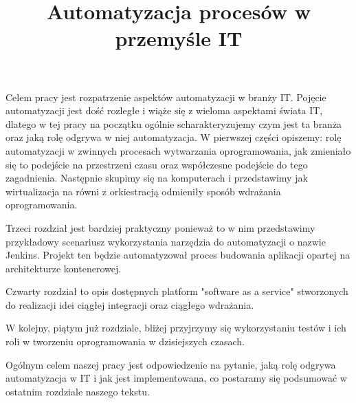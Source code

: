 \documentclass[twoside]{projektInzynierskiMS}
\title{Automatyzacja procesów w przemyśle IT}
\begin{document}
Celem pracy jest rozpatrzenie aspektów automatyzacji w branży IT. Pojęcie automatyzacji jest dość rozległe i wiąże się z wieloma aspektami świata IT, dlatego w tej pracy na początku ogólnie scharakteryzujemy czym jest ta branża oraz jaką rolę odgrywa w niej automatyzacja. W pierwszej części opiszemy: rolę automatyzacji w zwinnych procesach wytwarzania oprogramowania, jak zmieniało się to podejście na przestrzeni czasu oraz współczesne podejście do tego zagadnienia. Następnie skupimy się na komputerach i przedstawimy jak wirtualizacja na równi z orkiestracją odmieniły sposób wdrażania oprogramowania. 

Trzeci rozdział jest bardziej praktyczny ponieważ to w nim przedstawimy przykładowy scenariusz wykorzystania narzędzia do automatyzacji o nazwie Jenkins. Projekt ten będzie automatyzował proces budowania aplikacji opartej na architekturze kontenerowej.

Czwarty rozdział to opis dostępnych platform "software as a service" stworzonych do realizacji idei ciągłej integracji oraz ciągłego wdrażania. 

W kolejny, piątym już rozdziale, bliżej przyjrzymy się wykorzystaniu testów i ich roli w tworzeniu oprogramowania w dzisiejszych czasach. 

Ogólnym celem naszej pracy jest odpowiedzenie na pytanie, jaką rolę odgrywa automatyzacja w IT i jak jest implementowana, co postaramy się podsumować w ostatnim rozdziale naszego tekstu.








\end{document}
